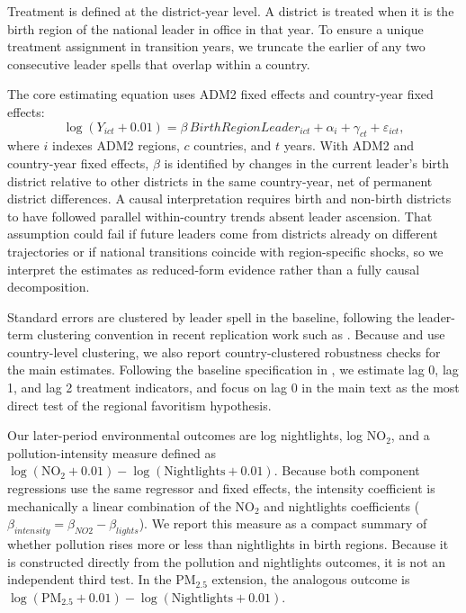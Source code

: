 \documentclass[9pt,twocolumn,twoside]{pnas-new}
\begin{document}
Treatment is defined at the district-year level. A district is treated when it is the birth region of the national leader in office in that year. To ensure a unique treatment assignment in transition years, we truncate the earlier of any two consecutive leader spells that overlap within a country.

The core estimating equation uses ADM2 fixed effects and country-year fixed effects:
\[
\log(Y_{i c t} + 0.01) = \beta \, BirthRegionLeader_{i c t} + \alpha_i + \gamma_{c t} + \varepsilon_{i c t},
\]
where $i$ indexes ADM2 regions, $c$ countries, and $t$ years. With ADM2 and country-year fixed effects, $\beta$ is identified by changes in the current leader's birth district relative to other districts in the same country-year, net of permanent district differences. A causal interpretation requires birth and non-birth districts to have followed parallel within-country trends absent leader ascension. That assumption could fail if future leaders come from districts already on different trajectories or if national transitions coincide with region-specific shocks, so we interpret the estimates as reduced-form evidence rather than a fully causal decomposition.

Standard errors are clustered by leader spell in the baseline, following the leader-term clustering convention in recent replication work such as \cite{Bora2025}. Because \cite{HodlerRaschky2014} and \cite{DubenHodlerRaschky2026} use country-level clustering, we also report country-clustered robustness checks for the main estimates. Following the baseline specification in \cite{HodlerRaschky2014}, we estimate lag 0, lag 1, and lag 2 treatment indicators, and focus on lag 0 in the main text as the most direct test of the regional favoritism hypothesis.

Our later-period environmental outcomes are log nightlights, log NO$_2$, and a pollution-intensity measure defined as $\log(\text{NO}_2 + 0.01) - \log(\text{Nightlights} + 0.01)$. Because both component regressions use the same regressor and fixed effects, the intensity coefficient is mechanically a linear combination of the NO$_2$ and nightlights coefficients ($\beta_{intensity} = \beta_{NO2} - \beta_{lights}$). We report this measure as a compact summary of whether pollution rises more or less than nightlights in birth regions. Because it is constructed directly from the pollution and nightlights outcomes, it is not an independent third test. In the PM$_{2.5}$ extension, the analogous outcome is $\log(\text{PM}_{2.5} + 0.01) - \log(\text{Nightlights} + 0.01)$.
\end{document}
